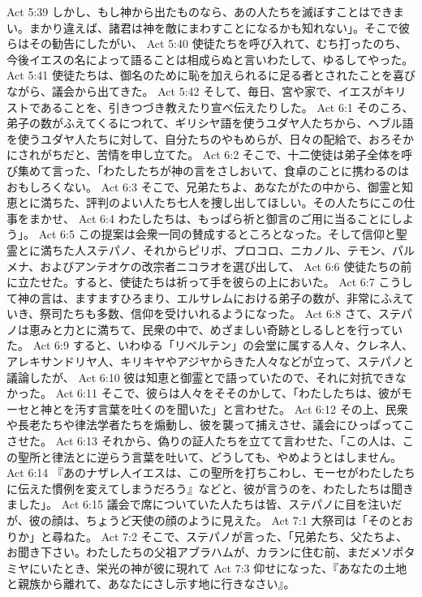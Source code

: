Act 5:39  しかし、もし神から出たものなら、あの人たちを滅ぼすことはできまい。まかり違えば、諸君は神を敵にまわすことになるかも知れない」。そこで彼らはその勧告にしたがい、
Act 5:40  使徒たちを呼び入れて、むち打ったのち、今後イエスの名によって語ることは相成らぬと言いわたして、ゆるしてやった。
Act 5:41  使徒たちは、御名のために恥を加えられるに足る者とされたことを喜びながら、議会から出てきた。
Act 5:42  そして、毎日、宮や家で、イエスがキリストであることを、引きつづき教えたり宣べ伝えたりした。
Act 6:1  そのころ、弟子の数がふえてくるにつれて、ギリシヤ語を使うユダヤ人たちから、ヘブル語を使うユダヤ人たちに対して、自分たちのやもめらが、日々の配給で、おろそかにされがちだと、苦情を申し立てた。
Act 6:2  そこで、十二使徒は弟子全体を呼び集めて言った、「わたしたちが神の言をさしおいて、食卓のことに携わるのはおもしろくない。
Act 6:3  そこで、兄弟たちよ、あなたがたの中から、御霊と知恵とに満ちた、評判のよい人たち七人を捜し出してほしい。その人たちにこの仕事をまかせ、
Act 6:4  わたしたちは、もっぱら祈と御言のご用に当ることにしよう」。
Act 6:5  この提案は会衆一同の賛成するところとなった。そして信仰と聖霊とに満ちた人ステパノ、それからピリポ、プロコロ、ニカノル、テモン、パルメナ、およびアンテオケの改宗者ニコラオを選び出して、
Act 6:6  使徒たちの前に立たせた。すると、使徒たちは祈って手を彼らの上においた。
Act 6:7  こうして神の言は、ますますひろまり、エルサレムにおける弟子の数が、非常にふえていき、祭司たちも多数、信仰を受けいれるようになった。
Act 6:8  さて、ステパノは恵みと力とに満ちて、民衆の中で、めざましい奇跡としるしとを行っていた。
Act 6:9  すると、いわゆる「リベルテン」の会堂に属する人々、クレネ人、アレキサンドリヤ人、キリキヤやアジヤからきた人々などが立って、ステパノと議論したが、
Act 6:10  彼は知恵と御霊とで語っていたので、それに対抗できなかった。
Act 6:11  そこで、彼らは人々をそそのかして、「わたしたちは、彼がモーセと神とを汚す言葉を吐くのを聞いた」と言わせた。
Act 6:12  その上、民衆や長老たちや律法学者たちを煽動し、彼を襲って捕えさせ、議会にひっぱってこさせた。
Act 6:13  それから、偽りの証人たちを立てて言わせた、「この人は、この聖所と律法とに逆らう言葉を吐いて、どうしても、やめようとはしません。
Act 6:14  『あのナザレ人イエスは、この聖所を打ちこわし、モーセがわたしたちに伝えた慣例を変えてしまうだろう』などと、彼が言うのを、わたしたちは聞きました」。
Act 6:15  議会で席についていた人たちは皆、ステパノに目を注いだが、彼の顔は、ちょうど天使の顔のように見えた。
Act 7:1  大祭司は「そのとおりか」と尋ねた。
Act 7:2  そこで、ステパノが言った、「兄弟たち、父たちよ、お聞き下さい。わたしたちの父祖アブラハムが、カランに住む前、まだメソポタミヤにいたとき、栄光の神が彼に現れて
Act 7:3  仰せになった、『あなたの土地と親族から離れて、あなたにさし示す地に行きなさい』。
